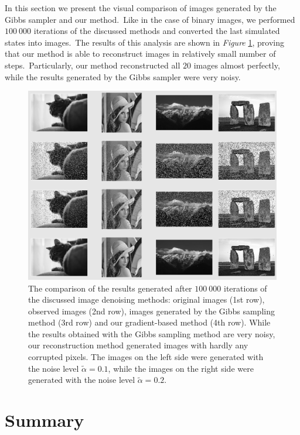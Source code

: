 \documentclass[shortabstract, english, lic]{iithesis}
\newcommand\numberedchapter[1]{\setlength\topskip{3cm}\chapter{#1}\setlength\topskip{0cm}}
\theoremstyle{default_theorem_style}\newtheorem{theorem}{Theorem}
\theoremstyle{default_theorem_style}\newtheorem{definition}{Definition}
\begin{document}
In this section we present the visual comparison of images generated by the Gibbs sampler and our method.\ Like
in the case of binary images, we performed $100\ 000$ iterations of the discussed methods and converted the last
simulated states into images.\ The results of this analysis are shown in \textit{Figure}
\ref{fig:grayscale_qualitative_results}, proving that our method is able to reconstruct images in relatively
small number of steps.\ Particularly, our method reconstructed all $20$ images almost perfectly, while the
results generated by the Gibbs sampler were very noisy.\newline

\begin{figure}[H]
\centering
\includegraphics[scale=0.385]{grayscale_qualitative_results}
\caption{The comparison of the results generated after $100\ 000$ iterations of the discussed image denoising
methods: original images (1st row), observed images (2nd row), images generated by the Gibbs
sampling method (3rd row) and our gradient-based method (4th row). While the results obtained with the Gibbs
sampling method are very noisy, our reconstruction method generated images with hardly any corrupted pixels. The
images on the left side were generated with the noise level $\tilde{\alpha} = 0.1$, while the images on the right
side were generated with the noise level $\tilde{\alpha} = 0.2$.}
\label{fig:grayscale_qualitative_results}
\end{figure}

\numberedchapter{Summary}
\end{document}
